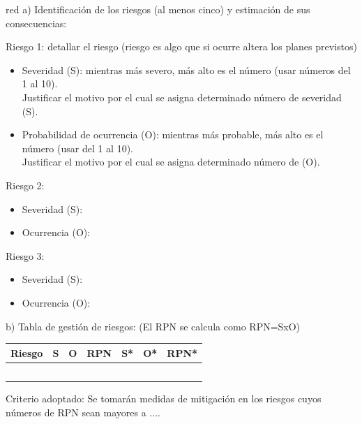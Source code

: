 \documentclass[11pt]{charter}
\begin{document}
\begin{consigna}{red}
a) Identificación de los riesgos (al menos cinco) y estimación de sus consecuencias:
 
Riesgo 1: detallar el riesgo (riesgo es algo que si ocurre altera los planes previstos)
\begin{itemize}
\item Severidad (S): mientras más severo, más alto es el número (usar números del 1 al 10).\\
Justificar el motivo por el cual se asigna determinado número de severidad (S).
\item Probabilidad de ocurrencia (O): mientras más probable, más alto es el número (usar del 1 al 10).\\
Justificar el motivo por el cual se asigna determinado número de (O). 
\end{itemize}   

Riesgo 2:
\begin{itemize}
\item Severidad (S): 
\item Ocurrencia (O):
\end{itemize}

Riesgo 3:
\begin{itemize}
\item Severidad (S): 
\item Ocurrencia (O):
\end{itemize}


b) Tabla de gestión de riesgos:      (El RPN se calcula como RPN=SxO)

\begin{table}[htpb]
\centering
\begin{tabularx}{\linewidth}{@{}|X|c|c|c|c|c|c|@{}}
\hline
\rowcolor[HTML]{C0C0C0} 
Riesgo & S & O & RPN & S* & O* & RPN* \\ \hline
       &   &   &     &    &    &      \\ \hline
       &   &   &     &    &    &      \\ \hline
       &   &   &     &    &    &      \\ \hline
       &   &   &     &    &    &      \\ \hline
       &   &   &     &    &    &      \\ \hline
\end{tabularx}%
\end{table}

Criterio adoptado: 
Se tomarán medidas de mitigación en los riesgos cuyos números de RPN sean mayores a ....


\end{consigna}
\end{document}
